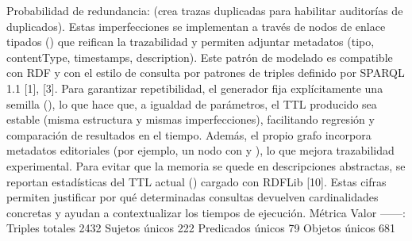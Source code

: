 \markdownRendererUlItem Probabilidad de redundancia:  (crea trazas duplicadas para habilitar auditorías de duplicados).\markdownRendererUlItemEnd 
\markdownRendererUlEndTight \markdownRendererInterblockSeparator
{}Estas imperfecciones se implementan a través de nodos de enlace tipados () que reifican la trazabilidad y permiten adjuntar metadatos (tipo, contentType, timestamps, description). Este patrón de modelado es compatible con RDF y con el estilo de consulta por patrones de triples definido por SPARQL 1.1 [1], [3].\markdownRendererInterblockSeparator
{}\markdownRendererInterblockSeparator
{}Para garantizar repetibilidad, el generador fija explícitamente una semilla (), lo que hace que, a igualdad de parámetros, el TTL producido sea estable (misma estructura y mismas imperfecciones), facilitando regresión y comparación de resultados en el tiempo. Además, el propio grafo incorpora metadatos editoriales (por ejemplo, un nodo  con  y ), lo que mejora trazabilidad experimental.\markdownRendererInterblockSeparator
{}\markdownRendererInterblockSeparator
{}Para evitar que la memoria se quede en descripciones abstractas, se reportan estadísticas del TTL actual () cargado con RDFLib [10]. Estas cifras permiten justificar por qué determinadas consultas devuelven cardinalidades concretas y ayudan a contextualizar los tiempos de ejecución.\markdownRendererInterblockSeparator
{}\markdownRendererInterblockSeparator
{}\markdownRendererPipe{} Métrica \markdownRendererPipe{} Valor \markdownRendererPipe{} \markdownRendererPipe{}---\markdownRendererPipe{}---:\markdownRendererPipe{} \markdownRendererPipe{} Triples totales \markdownRendererPipe{} 2432 \markdownRendererPipe{} \markdownRendererPipe{} Sujetos únicos \markdownRendererPipe{} 222 \markdownRendererPipe{} \markdownRendererPipe{} Predicados únicos \markdownRendererPipe{} 79 \markdownRendererPipe{} \markdownRendererPipe{} Objetos únicos \markdownRendererPipe{} 681 \markdownRendererPipe{}\markdownRendererInterblockSeparator
